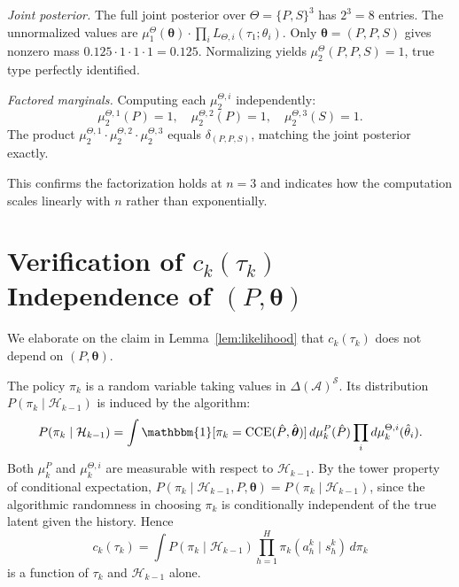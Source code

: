 \textit{Joint posterior.} The full joint posterior over $\Theta = \{P,S\}^3$ has $2^3 = 8$ entries. The unnormalized values are $\mu_1^\Theta(\boldsymbol{\theta}) \cdot \prod_i L_{\Theta,i}(\tau_1; \theta_i)$. Only $\boldsymbol{\theta} = (P,P,S)$ gives nonzero mass $0.125 \cdot 1 \cdot 1 \cdot 1 = 0.125$. Normalizing yields $\mu_2^\Theta(P,P,S) = 1$, true type perfectly identified.

\textit{Factored marginals.} Computing each $\mu_2^{\Theta,i}$ independently:
\begin{equation}
\mu_2^{\Theta,1}(P) = 1, \quad \mu_2^{\Theta,2}(P) = 1, \quad \mu_2^{\Theta,3}(S) = 1.
\end{equation}
The product $\mu_2^{\Theta,1} \cdot \mu_2^{\Theta,2} \cdot \mu_2^{\Theta,3}$ equals $\delta_{(P,P,S)}$, matching the joint posterior exactly.

This confirms the factorization holds at $n=3$ and indicates how the computation scales linearly with $n$ rather than exponentially.

\section{Verification of \texorpdfstring{$c_k(\tau_k)$}{c\_k(tau\_k)} Independence of \texorpdfstring{$(P, \boldsymbol{\theta})$}{(P, theta)}}
\label{app:ck}

We elaborate on the claim in Lemma~\ref{lem:likelihood} that $c_k(\tau_k)$ does not depend on $(P, \boldsymbol{\theta})$.

The policy $\pi_k$ is a random variable taking values in $\Delta(\mathcal{A})^{\mathcal{S}}$. Its distribution $P(\pi_k \mid \mathcal{H}_{k-1})$ is induced by the algorithm:
\begin{equation}
P(\pi_k \mid \mathcal{H}_{k-1}) = \int \mathbbm{1}[\pi_k = \mathrm{CCE}(\hat{P}, \hat{\boldsymbol{\theta}})] \, d\mu_k^P(\hat{P}) \prod_i d\mu_k^{\Theta,i}(\hat{\theta}_i).
\end{equation}
Both $\mu_k^P$ and $\mu_k^{\Theta,i}$ are measurable with respect to $\mathcal{H}_{k-1}$. By the tower property of conditional expectation, $P(\pi_k \mid \mathcal{H}_{k-1}, P, \boldsymbol{\theta}) = P(\pi_k \mid \mathcal{H}_{k-1})$, since the algorithmic randomness in choosing $\pi_k$ is conditionally independent of the true latent given the history. Hence
\begin{equation}
c_k(\tau_k) = \int P(\pi_k \mid \mathcal{H}_{k-1}) \prod_{h=1}^H \pi_k(a_h^k \mid s_h^k) \, d\pi_k
\end{equation}
is a function of $\tau_k$ and $\mathcal{H}_{k-1}$ alone.

